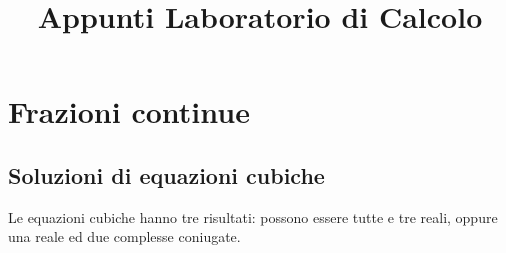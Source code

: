 \documentclass[11pt]{article}
\title{Appunti Laboratorio di Calcolo}
\begin{document}
\section{Frazioni continue}
\subsection{Soluzioni di equazioni cubiche}
Le equazioni cubiche hanno tre risultati: possono essere tutte e tre reali, oppure una reale ed due complesse coniugate.
\end{document}
